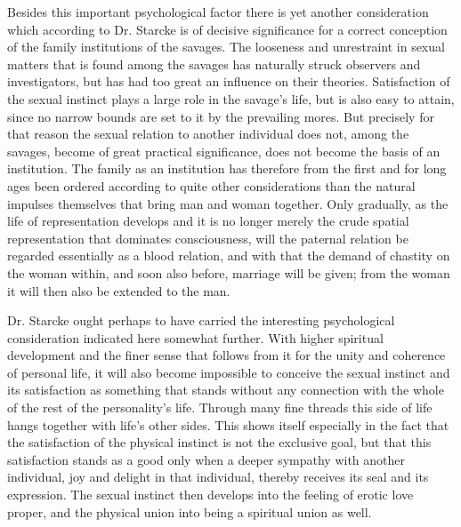 \documentclass[12pt,a4paper,openany]{book}
\newcommand{\opage}[1]{\marginnote{\footnotesize\textit{[#1]}}}
\begin{document}
Besides this important psychological factor there is yet
another consideration which according to Dr. Starcke is of decisive significance
for a correct conception of the family institutions of the savages. The
looseness and unrestraint in sexual matters that is found among the
savages has naturally struck observers and investigators, but
has had too great an influence on their theories. Satisfaction
of the sexual instinct plays a large role in the savage's life, but is
also easy to attain, since no narrow bounds are set to it
by the prevailing mores. But precisely for that reason the sexual
relation to another individual does not, among the savages, become of great practical
significance, does not become the basis of an institution. The family as
an institution has therefore from the first and for long ages been ordered
according to quite other considerations than the natural impulses themselves that bring
man and woman together. Only gradually, as the life of representation
develops and it is no longer merely the crude spatial representation
that dominates consciousness, will the paternal relation be regarded essentially
as a blood relation, and with that the demand of chastity on the woman
within, and soon also before, marriage will be given; from the woman
it will then also be extended to the man.

Dr. Starcke ought perhaps to have carried the interesting psychological
consideration indicated here somewhat further. With
higher spiritual development and the finer sense that follows from it for
the unity and coherence of personal life, it will also become
impossible to conceive the sexual instinct and its satisfaction as something
that stands without any connection with the whole of the rest of the personality's
life. Through many fine threads this side of life hangs
together with life's other sides. This shows itself especially in the fact
that the satisfaction of the physical instinct is not the exclusive
goal, but that this satisfaction stands as a good only when
a deeper sympathy with another individual, joy and delight in
that individual, thereby receives its seal and its expression. The sexual instinct then
\opage{793}develops into the feeling of erotic love proper, and the physical union
into being a spiritual union as well.
\end{document}
